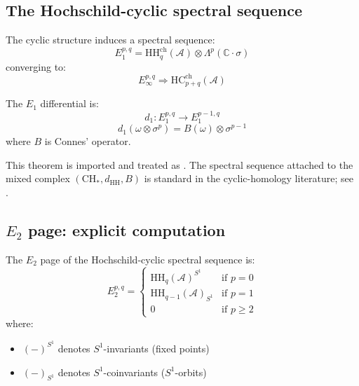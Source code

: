 \subsection{The Hochschild-cyclic spectral sequence}

\begin{theorem}
\label{thm:HC-spectral-sequence}
The cyclic structure induces a spectral sequence:
\[E_1^{p,q} = \text{HH}_{q}^{\text{ch}}(\mathcal{A}) \otimes \Lambda^p(\mathbb{C} \cdot \sigma)\]
converging to:
\[E_\infty^{p,q} \Rightarrow \text{HC}_{p+q}^{\text{ch}}(\mathcal{A})\]

The $E_1$ differential is:
\[d_1: E_1^{p,q} \to E_1^{p-1,q}\]
\[d_1(\omega \otimes \sigma^p) = B(\omega) \otimes \sigma^{p-1}\]
where $B$ is Connes' operator.
\end{theorem}

\begin{remark}
This theorem is imported and treated as \ClaimStatusProvedElsewhere. The
spectral sequence attached to the mixed complex $(\mathrm{CH}_*,d_{\mathrm{HH}},B)$
is standard in the cyclic-homology literature; see \cite{Connes85,Loday98}.
\end{remark}

\subsection{\texorpdfstring{$E_2$ page: explicit computation}{E2 page: explicit computation}}

\begin{theorem}
\label{thm:E2-page-formula}
The $E_2$ page of the Hochschild-cyclic spectral sequence is:
\[E_2^{p,q} = \begin{cases}
\text{HH}_q(\mathcal{A})^{S^1} & \text{if } p = 0 \\
\text{HH}_{q-1}(\mathcal{A})_{S^1} & \text{if } p = 1 \\
0 & \text{if } p \geq 2
\end{cases}\]
where:
\begin{itemize}
\item $(-)^{S^1}$ denotes $S^1$-invariants (fixed points)
\item $(-)_{S^1}$ denotes $S^1$-coinvariants ($S^1$-orbits)
\end{itemize}
\end{theorem}

